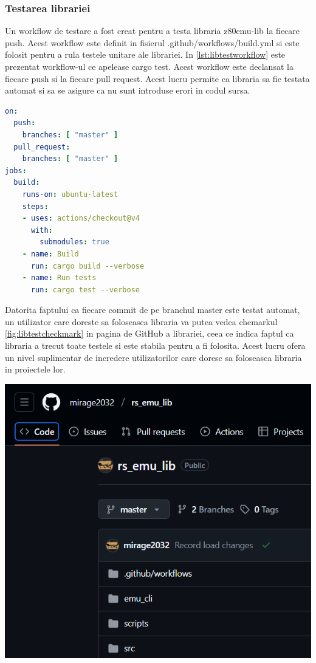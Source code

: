 \documentclass[titlepage,12pt]{article}
\DeclareRobustCommand{\code}[1]{{\ttfamily\small #1}}
\begin{document}
\subsubsection{Testarea librariei}
Un workflow de testare a fost creat pentru a testa libraria \code{z80emu-lib} la fiecare push. Acest workflow este definit in fisierul \code{.github/workflows/build.yml} si este folosit pentru a rula testele unitare ale librariei. In \cref{lst:libtestworkflow} este prezentat workflow-ul ce apelease \code{cargo test}. Acest workflow este declansat la fiecare push si la fiecare pull request. Acest lucru permite ca libraria sa fie testata automat si sa se asigure ca nu sunt introduse erori in codul sursa.
\begin{lstlisting}[language=yaml,caption={Workflow de testare a librariei},label={lst:libtestworkflow}]
on:
  push:
    branches: [ "master" ]
  pull_request:
    branches: [ "master" ]
jobs:
  build:
    runs-on: ubuntu-latest
    steps:
    - uses: actions/checkout@v4
      with:
        submodules: true
    - name: Build
      run: cargo build --verbose
    - name: Run tests
      run: cargo test --verbose
\end{lstlisting}

\begin{minipage}[c]{0.55\textwidth}
Datorita faptului ca fiecare commit de pe branchul \code{master} este testat automat, un utilizator care doreste sa foloseasca libraria va putea vedea chemarkul \cref{fig:libtestcheckmark} in pagina de GitHub a librariei, ceea ce indica faptul ca libraria a trecut toate testele si este stabila pentru a fi folosita. Acest lucru ofera un nivel suplimentar de incredere utilizatorilor care doresc sa foloseasca libraria in proiectele lor.
\end{minipage}
\hfill
\begin{minipage}[c]{0.4\textwidth}
    \centering
    \includegraphics[width=\textwidth]{images/libtestcheckmark.png}
    \label{fig:libtestcheckmark}
\end{minipage}
\end{document}
